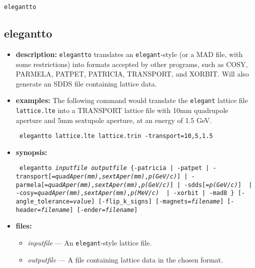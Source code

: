 \documentclass[11pt]{article}
\begin{document}
\newpage
\begin{center}{\Large\verb|elegantto|}\end{center}
\subsection{elegantto}
\label{elegantto}

\begin{itemize}
\item {\bf description:} 
\verb|elegantto| translates an {\tt elegant}-style (or a MAD file, with
some restrictions) into formats accepted by other programs, such as COSY,
PARMELA, PATPET, PATRICIA, TRANSPORT, and XORBIT.  Will also generate
an SDDS file containing lattice data.

\item {\bf examples:}
The following command would translate the {\tt elegant} lattice file 
\verb|lattice.lte| into a TRANSPORT lattice file with 10mm quadrupole
aperture and 5mm sextupole aperture, at an energy of 1.5 GeV.
\begin{flushleft}{\tt
elegantto lattice.lte lattice.trin -transport=10,5,1.5
}\end{flushleft}

\item {\bf synopsis:}
\begin{flushleft}{\tt
elegantto {\em inputfile} {\em outputfile}
 \{-patricia | -patpet | -transport[={\em quadAper(mm)},{\em sextAper(mm)},{\em p(GeV/c)}]
            | -parmela[={\em quadAper(mm)},{\em sextAper(mm)},{\em p(GeV/c)}]
            | -sdds[={\em p(GeV/c)}] \
            | -cosy={\em quadAper(mm)},{\em sextAper(mm)},{\em p(MeV/c)} \
            | -xorbit | -mad8 \}
 [-angle\_tolerance={\em value}] [-flip\_k\_signs] [-magnets={\em filename}]
 [-header={\em filename}] [-ender={\em filename}]
}\end{flushleft}

\item {\bf files:}
\begin{itemize}
\item {\em inputfile} --- An {\tt elegant}-style lattice file.
\item {\em outputfile} --- A file containing lattice data in the chosen format.
\end{itemize}


\end{itemize}
\end{document}
